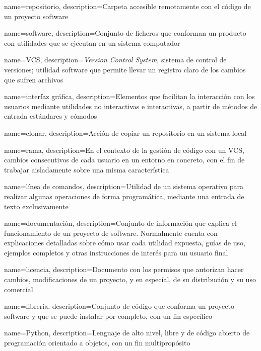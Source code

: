 {
    name={repositorio},
    description={Carpeta accesible remotamente con el código de un proyecto \gls{software}}
}

{
    name={software},
    description={Conjunto de ficheros que conforman un producto con utilidades que se ejecutan en un sistema computador}
}

{
    name={VCS},
    description={\textit{Version Control System}, sistema de control de versiones; utilidad \gls{software} que permite llevar un registro claro de los cambios que sufren archivos}
}

{
    name={interfaz gráfica},
    description={Elementos que facilitan la interacción con los usuarios mediante utilidades no interactivas e interactivas, a partir de métodos de entrada estándares y cómodos}
}

{
    name={clonar},
    description={Acción de copiar un \gls{repositorio} en un sistema local}
}

{
    name={rama},
    description={En el contexto de la gestión de código con un \gls{VCS}, cambios consecutivos de cada usuario en un entorno en concreto, con el fin de trabajar aisladamente sobre una misma característica}
}

{
    name={línea de comandos},
    description={Utilidad de un sistema operativo para realizar algunas operaciones de forma programática, mediante una entrada de texto exclusivamente}
}

{
    name={documentación},
    description={Conjunto de información que explica el funcionamiento de un proyecto de \gls{software}. Normalmente cuenta con explicaciones detalladas sobre cómo usar cada utilidad expuesta, guías de uso, ejemplos completos y otras instrucciones de interés para un usuario final}
}

{
    name={licencia},
    description={Documento con los permisos que autorizan hacer cambios, modificaciones de un proyecto, y en especial, de su distribución y su uso comercial}
}

{
    name={librería},
    description={Conjunto de código que conforma un proyecto \gls{software} y que se puede instalar por completo, con un fin específico}
}

{
    name={Python},
    description={Lenguaje de alto nivel, libre y de código abierto de programación orientado a objetos, con un fin multipropósito}
}

